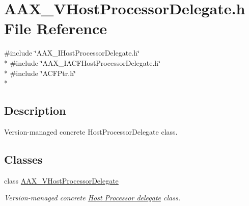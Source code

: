 \hypertarget{a00310}{}\section{A\+A\+X\+\_\+\+V\+Host\+Processor\+Delegate.\+h File Reference}
\label{a00310}
{\ttfamily \#include \char`\"{}A\+A\+X\+\_\+\+I\+Host\+Processor\+Delegate.\+h\char`\"{}}\\*
{\ttfamily \#include \char`\"{}A\+A\+X\+\_\+\+I\+A\+C\+F\+Host\+Processor\+Delegate.\+h\char`\"{}}\\*
{\ttfamily \#include \char`\"{}A\+C\+F\+Ptr.\+h\char`\"{}}\\*


\subsection{Description}
Version-\/managed concrete Host\+Processor\+Delegate class. 

\subsection*{Classes}
\begin{DoxyCompactItemize}
\item 
class \hyperlink{a00136}{A\+A\+X\+\_\+\+V\+Host\+Processor\+Delegate}
\begin{DoxyCompactList}\small\item\em Version-\/managed concrete \hyperlink{a00102}{Host Processor delegate} class. \end{DoxyCompactList}\end{DoxyCompactItemize}
